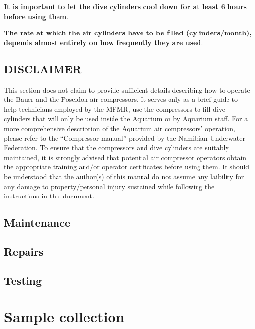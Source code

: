\documentclass[
  letterpaper,
  DIV=11,
  numbers=noendperiod]{scrreprt}
\begin{document}
\textbf{It is important to let the dive cylinders cool down for at least
6 hours before using them}.

\textbf{The rate at which the air cylinders have to be filled
(cylinders/month), depends almost entirely on how frequently they are
used}.

\hypertarget{disclaimer}{%
\section*{\texorpdfstring{{DISCLAIMER}}{DISCLAIMER}}\label{disclaimer}}


{This section does not claim to provide sufficient details describing
how to operate the Bauer and the Poseidon air compressors. It serves
only as a brief guide to help technicians employed by the MFMR, use the
compressors to fill dive cylinders that will only be used inside the
Aquarium or by Aquarium staff. For a more comprehensive description of
the Aquarium air compressors' operation, please refer to the
``Compressor manual'' provided by the Namibian Underwater Federation. To
ensure that the compressors and dive cylinders are suitably maintained,
it is strongly advised that potential air compressor operators obtain
the appropriate training and/or operator certificates before using them.
It should be understood that the author(s) of this manual do not assume
any laibility for any damage to property/personal injury sustained while
following the instructions in this document.}

\hypertarget{maintenance-1}{%
\section{Maintenance}\label{maintenance-1}}

\hypertarget{repairs-3}{%
\section{Repairs}\label{repairs-3}}

\hypertarget{testing}{%
\section{Testing}\label{testing}}

\hypertarget{sec-sample-collection}{%
\chapter{Sample collection}\label{sec-sample-collection}}
\end{document}
